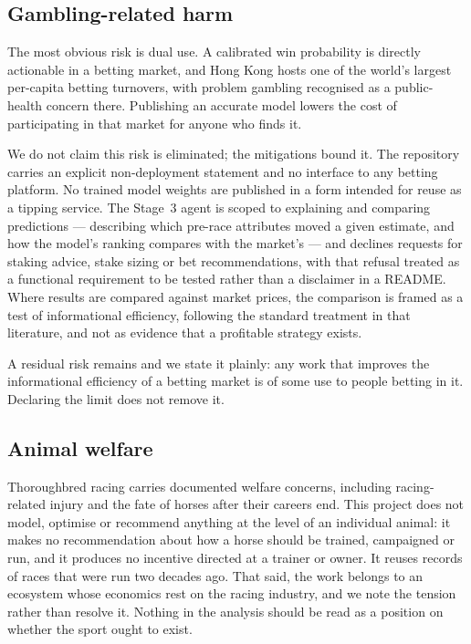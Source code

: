 \subsection{Gambling-related harm}

The most obvious risk is dual use. A calibrated win probability is
directly actionable in a betting market, and Hong Kong hosts one of the
world's largest per-capita betting turnovers, with problem gambling
recognised as a public-health concern there. Publishing an accurate model
lowers the cost of participating in that market for anyone who finds it.

We do not claim this risk is eliminated; the mitigations bound it. The
repository carries an explicit non-deployment statement and no interface
to any betting platform. No trained model weights are published in a form
intended for reuse as a tipping service. The Stage~3 agent is scoped to
explaining and comparing predictions --- describing which pre-race
attributes moved a given estimate, and how the model's ranking compares
with the market's --- and declines requests for staking advice, stake
sizing or bet recommendations, with that refusal treated as a functional
requirement to be tested rather than a disclaimer in a README. Where
results are compared against market prices, the comparison is framed as a
test of informational efficiency, following the standard treatment in that
literature, and not as evidence that a profitable strategy exists.

A residual risk remains and we state it plainly: any work that improves
the informational efficiency of a betting market is of some use to people
betting in it. Declaring the limit does not remove it.

\subsection{Animal welfare}

Thoroughbred racing carries documented welfare concerns, including
racing-related injury and the fate of horses after their careers end.
This project does not model, optimise or recommend anything at the level
of an individual animal: it makes no recommendation about how a horse
should be trained, campaigned or run, and it produces no incentive
directed at a trainer or owner. It reuses records of races that were run
two decades ago. That said, the work belongs to an ecosystem whose
economics rest on the racing industry, and we note the tension rather than
resolve it. Nothing in the analysis should be read as a position on
whether the sport ought to exist.

